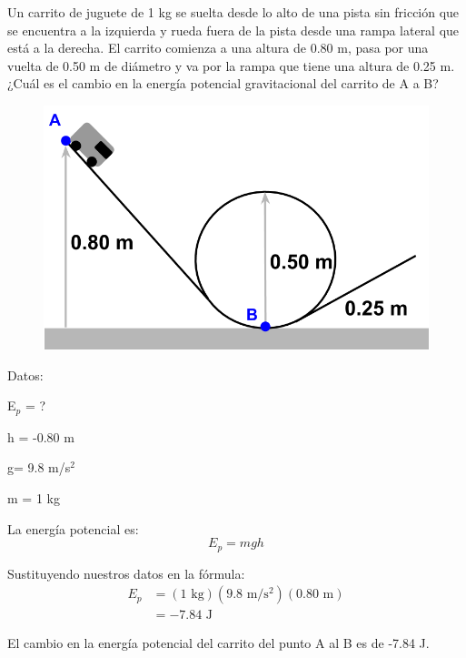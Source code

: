 Un carrito de juguete de 1 kg se suelta desde lo alto de una pista sin fricción que se encuentra a la izquierda y rueda fuera de la pista desde una rampa lateral que está a la derecha. El carrito comienza a una altura de 0.80 m, pasa por una vuelta de 0.50 m de diámetro y va por la rampa que tiene una altura de 0.25 m. ¿Cuál es el cambio en la energía potencial gravitacional del carrito de A a B?

\begin{minipage}{0.25\textwidth}
    \begin{figure}[H]
        \includegraphics[width=\linewidth]{../images/3bea8730ba0fcd65f1afe168f731639595d83c74.png}
    \end{figure}
\end{minipage}\hfill
\begin{minipage}{0.68\textwidth}
    \begin{solutionbox}{5.2cm}
        \begin{multicols}{2}
            Datos:

            E$_p$ = ?

            h = -0.80 m

            g= 9.8 m/s$^2$

            m = 1 kg

            La energía potencial es:
            \[E_p=mgh\]

            \vspace{1.5cm}

            Sustituyendo nuestros datos en la fórmula:
            \[
                \begin{array}{rl}
                    E_p & = (1 \text{ kg})(9.8 \text{ m/s$^2$})(0.80 \text{ m}) \\[1em]
                        & =-7.84 \text{ J }
                \end{array}
            \]
        \end{multicols}
        \begin{center}El cambio en la energía potencial del carrito del punto A al B es de -7.84 J.\end{center}
    \end{solutionbox}
\end{minipage}